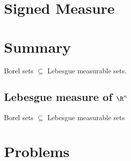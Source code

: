 
\section{Signed Measure}


\section{Summary}

Borel sets $\subseteq$ Lebesgue measurable sets.

\subsection{Lebesgue measure of $\R^n$}

Borel sets $\subseteq$ Lebesgue measurable sets


\section{Problems}
